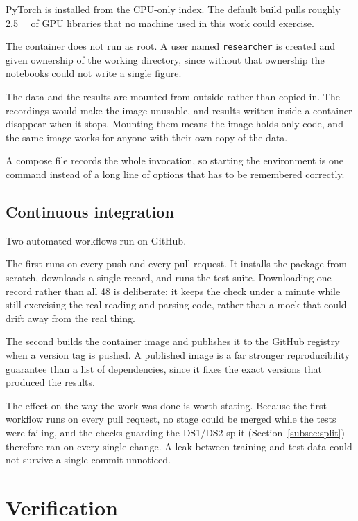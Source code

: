 \documentclass[a4paper, 12pt]{article}
\begin{document}
PyTorch is installed from the CPU-only index. The default build pulls roughly
\SI{2.5}{\giga\byte} of GPU libraries that no machine used in this work could
exercise.

The container does not run as root. A user named \texttt{researcher} is created
and given ownership of the working directory, since without that ownership the
notebooks could not write a single figure.

The data and the results are mounted from outside rather than copied in. The
recordings would make the image unusable, and results written inside a container
disappear when it stops. Mounting them means the image holds only code, and the
same image works for anyone with their own copy of the data.

A compose file records the whole invocation, so starting the environment is one
command instead of a long line of options that has to be remembered correctly.

\subsection{Continuous integration} \label{subsec:ci}

Two automated workflows run on GitHub.

The first runs on every push and every pull request. It installs the package from
scratch, downloads a single record, and runs the test suite. Downloading one
record rather than all 48 is deliberate: it keeps the check under a minute while
still exercising the real reading and parsing code, rather than a mock that could
drift away from the real thing.

The second builds the container image and publishes it to the GitHub registry when
a version tag is pushed. A published image is a far stronger reproducibility
guarantee than a list of dependencies, since it fixes the exact versions that
produced the results.

The effect on the way the work was done is worth stating. Because the first
workflow runs on every pull request, no stage could be merged while the tests were
failing, and the checks guarding the DS1/DS2 split (Section~\ref{subsec:split})
therefore ran on every single change. A leak between training and test data could
not survive a single commit unnoticed.




\section{Verification} \label{sec:verification}
\end{document}
